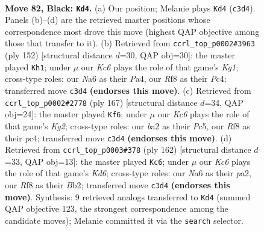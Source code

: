 \documentclass[11pt]{article}
\begin{document}
\clearpage

\begin{figure}[p]\centering
\begin{subfigure}{0.46\textwidth}\centering
\resizebox{\linewidth}{!}{%
\newchessgame
\chessboard[
  setfen={5r2/5p2/n5p1/4P2p/b4Pp1/2k3N1/B6P/6K1 b - - 23 82},
  showmover=false,
  pgfstyle=straightmove, color=movearrow, markmove={c3-d4}
]}
\caption{}
\end{subfigure}\hfill
\begin{subfigure}{0.46\textwidth}\centering
\resizebox{\linewidth}{!}{%
\newchessgame
\chessboard[
  setfen={B7/8/6k1/p1b2p2/P1P1p1p1/4P1P1/5P2/6K1 w - - 24 77},
  showmover=false,
  pgfstyle=straightmove, color=movearrow, markmove={g1-h1}
]}
\caption{}
\end{subfigure}
\\[4pt]
\begin{subfigure}{0.46\textwidth}\centering
\resizebox{\linewidth}{!}{%
\newchessgame
\chessboard[
  setfen={8/6k1/6p1/2p1pp1p/2P1p2P/6P1/2B2K2/8 b - - 51 84},
  showmover=false,
  pgfstyle=straightmove, color=movearrow, markmove={g7-f6}
]}
\caption{}
\end{subfigure}\hfill
\begin{subfigure}{0.46\textwidth}\centering
\resizebox{\linewidth}{!}{%
\newchessgame
\chessboard[
  setfen={8/6k1/3K4/1p1pP3/1PpP2P1/2P2b2/pB6/8 w - - 3 82},
  showmover=false,
  pgfstyle=straightmove, color=movearrow, markmove={d6-c6}
]}
\caption{}
\end{subfigure}
\caption{\textbf{Move 82, Black: \texttt{Kd4}.} (a) Our position; Melanie plays \texttt{Kd4} (\texttt{c3d4}). Panels (b)--(d) are the retrieved master positions whose correspondence most drove this move (highest QAP objective among those that transfer to it). (b) Retrieved from \texttt{ccrl\_top\_p0002\#3963} (ply 152) [structural distance $d$=30, QAP obj=30]: the master played \texttt{Kh1}; under $\mu$ our \emph{Kc6} plays the role of that game's \emph{Kg1}; cross-type roles: our \emph{N}a6 as their \emph{P}a4, our \emph{R}f8 as their \emph{P}c4; transferred move \texttt{c3d4} \textbf{(endorses this move)}. (c) Retrieved from \texttt{ccrl\_top\_p0002\#2778} (ply 167) [structural distance $d$=34, QAP obj=24]: the master played \texttt{Kf6}; under $\mu$ our \emph{Kc6} plays the role of that game's \emph{Kg2}; cross-type roles: our \emph{b}a2 as their \emph{P}c5, our \emph{R}f8 as their \emph{p}c4; transferred move \texttt{c3d4} \textbf{(endorses this move)}. (d) Retrieved from \texttt{ccrl\_top\_p0003\#378} (ply 162) [structural distance $d$=33, QAP obj=13]: the master played \texttt{Kc6}; under $\mu$ our \emph{Kc6} plays the role of that game's \emph{Kd6}; cross-type roles: our \emph{N}a6 as their \emph{p}a2, our \emph{R}f8 as their \emph{B}b2; transferred move \texttt{c3d4} \textbf{(endorses this move)}. Synthesis: 9 retrieved analogs transferred to \texttt{Kd4} (summed QAP objective 123, the strongest correspondence among the candidate moves); Melanie committed it via the \texttt{search} selector.}
\label{fig:thought-m163}
\end{figure}
\end{document}
